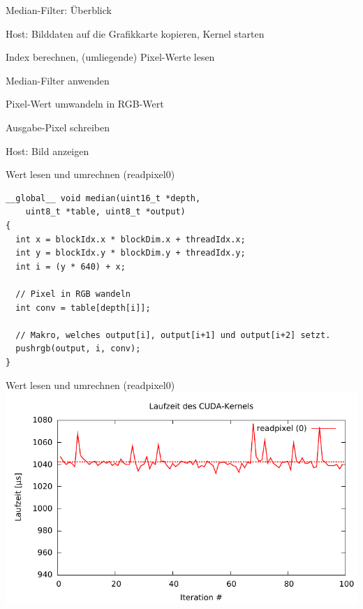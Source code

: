 \documentclass[compress]{beamer}
\begin{document}
\begin{frame}{Median-Filter: Überblick}
    \begin{list}{.}{\itemsep=1em}
        \item Host: Bilddaten auf die Grafikkarte kopieren, Kernel starten
        \item Index berechnen, (umliegende) Pixel-Werte lesen
        \item Median-Filter anwenden
        \item Pixel-Wert umwandeln in RGB-Wert
        \item Ausgabe-Pixel schreiben
        \item Host: Bild anzeigen
    \end{list}
\end{frame}

\begin{frame}[fragile]{Wert lesen und umrechnen (readpixel0)}
\begin{lstlisting}
__global__ void median(uint16_t *depth,
    uint8_t *table, uint8_t *output)
{
  int x = blockIdx.x * blockDim.x + threadIdx.x;
  int y = blockIdx.y * blockDim.y + threadIdx.y;
  int i = (y * 640) + x;

  // Pixel in RGB wandeln
  int conv = table[depth[i]];

  // Makro, welches output[i], output[i+1] und output[i+2] setzt.
  pushrgb(output, i, conv);
}
\end{lstlisting}
\end{frame}

\begin{frame}[fragile]{Wert lesen und umrechnen (readpixel0)}
\includegraphics[width=\textwidth]{readpixel0.pdf}
\end{frame}
\end{document}
